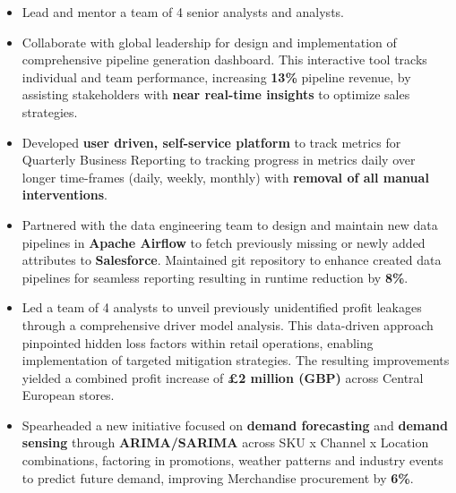 \begin{itemize}
  \item Lead and mentor a team of 4 senior analysts and analysts.
  \item Collaborate with global leadership for design and implementation of comprehensive pipeline generation dashboard. This interactive tool tracks individual and team performance, increasing \textbf{13\%} pipeline revenue, by assisting stakeholders with \textbf{near real-time insights} to optimize sales strategies.
  \item Developed \textbf{user driven, self-service platform} to track metrics for Quarterly Business Reporting to tracking progress in metrics daily over longer time-frames (daily, weekly, monthly) with \textbf{removal of all manual interventions}.
  \item Partnered with the data engineering team to design and maintain new data pipelines in \textbf{Apache Airflow} to fetch previously missing or newly added attributes to \textbf{Salesforce}. Maintained git repository to enhance created data pipelines for seamless reporting resulting in runtime reduction by \textbf{8\%}.
\end{itemize}
{\footnotesize{      }}


\vspace{2pt}
\begin{itemize}
  \item Led a team of 4 analysts to unveil previously unidentified profit leakages through a comprehensive driver model analysis. This data-driven approach pinpointed hidden loss factors within retail operations, enabling implementation of targeted mitigation strategies. The resulting improvements yielded a combined profit increase of \textbf{£2 million (GBP)} across Central European stores.
  \item Spearheaded a new initiative focused on \textbf{demand forecasting} and \textbf{demand sensing} through \textbf{ARIMA/SARIMA} across SKU x Channel x Location combinations, factoring in promotions, weather patterns and industry events to predict future demand, improving Merchandise procurement by \textbf{6\%}.
\end{itemize}
{\footnotesize{      }}

